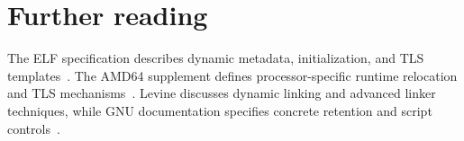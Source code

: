 \section{Further reading}
\label{sec:ch59-reading}
The ELF specification describes dynamic metadata, initialization, and TLS templates~\cite{xinuos-2026-elf}.
The AMD64 supplement defines processor-specific runtime relocation and TLS mechanisms~\cite{matz-2012-amd64}.
Levine discusses dynamic linking and advanced linker techniques, while GNU documentation specifies concrete retention and script controls~\cite{levine-1999-linkers,gnu-2026-ld}.
